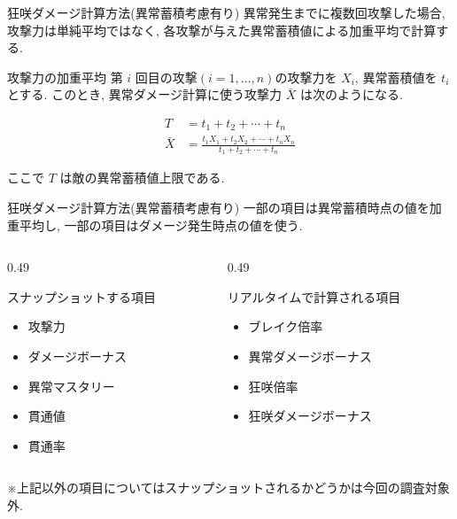 \documentclass[aspectratio=169]{beamer}
\begin{document}

\begin{frame}{狂咲ダメージ計算方法(異常蓄積考慮有り)}
異常発生までに複数回攻撃した場合, 攻撃力は単純平均ではなく,
各攻撃が与えた異常蓄積値による加重平均で計算する.

\begin{block}{攻撃力の加重平均}
\small
第 $i$ 回目の攻撃$(i = 1, ..., n)$の攻撃力を $X_i$, 異常蓄積値を $t_i$ とする.
このとき, 異常ダメージ計算に使う攻撃力 $\bar{X}$ は次のようになる.

\[
\begin{aligned}
T
&=
t_1+t_2+\cdots+t_n
\\
\bar{X}
&=
\frac{
t_1X_1+t_2X_2+\cdots+t_nX_n
}{
t_1+t_2+\cdots+t_n
}
\end{aligned}
\]

\end{block}

ここで $T$ は敵の異常蓄積値上限である. 

\end{frame}
\begin{frame}{狂咲ダメージ計算方法(異常蓄積考慮有り)}
一部の項目は異常蓄積時点の値を加重平均し,
一部の項目はダメージ発生時点の値を使う.

\begin{columns}[T,onlytextwidth]
\begin{column}{0.49\linewidth}
\begin{block}{スナップショットする項目}
\small
\begin{itemize}
  \item 攻撃力
  \item ダメージボーナス
  \item 異常マスタリー
  \item 貫通値
  \item 貫通率
\end{itemize}
\end{block}
\end{column}

\begin{column}{0.49\linewidth}
\begin{block}{リアルタイムで計算される項目}
\small
\begin{itemize}
  \item ブレイク倍率
  \item 異常ダメージボーナス
  \item 狂咲倍率
  \item 狂咲ダメージボーナス
\end{itemize}
\end{block}
\end{column}
\end{columns}

\vspace{0.5em}
\small
※上記以外の項目についてはスナップショットされるかどうかは今回の調査対象外.

\end{frame}
\end{document}

